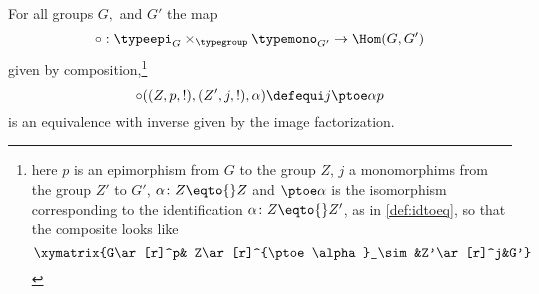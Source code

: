   \begin{construction}\label{con:im}
    For all groups $G,$ and $G'$ the map
    $$
    \circ:\typeepi_G\times_{\typegroup}\typemono_{G'}\to\Hom(G,G')
    $$
    given by composition,\footnote{here $p$ is an epimorphism from $G$ to the group $Z$, $j$ a monomorphims from the group $Z'$ to $G'$, $\alpha\colon Z\eqto{}Z$
      and $\ptoe\alpha$ is the isomorphism corresponding to the identification $\alpha\colon Z\eqto{}Z'$, as in \cref{def:idtoeq},
      so that the composite looks like
    $$\xymatrix{G\ar[r]^p& Z\ar[r]^{\ptoe\alpha}_\sim&Z'\ar[r]^j&G'}$$}
    $$\circ((Z,p,!),(Z',j,!),\alpha)\defequi j\ptoe \alpha p$$
    is an equivalence
    with inverse given by the image factorization.
\end{construction}
